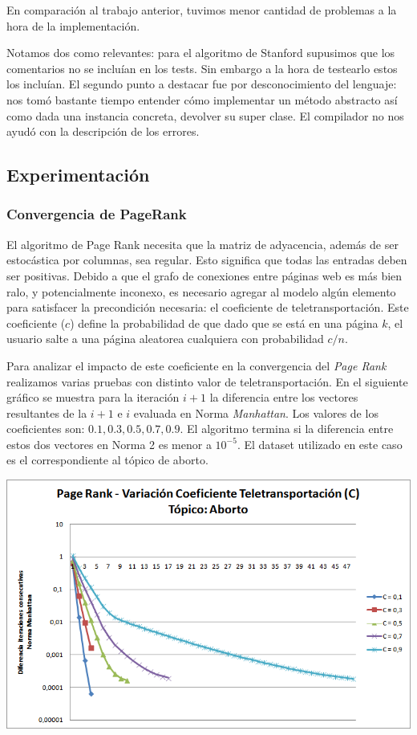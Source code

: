	En comparación al trabajo anterior, tuvimos menor cantidad de problemas a la hora de la implementación. 

	Notamos dos como relevantes: para el algoritmo de Stanford supusimos que los comentarios no se incluían en los tests. Sin embargo a la hora de testearlo estos los incluían. El segundo punto a destacar fue por desconocimiento del lenguaje: nos tomó bastante tiempo entender cómo implementar un método abstracto así como dada una instancia concreta, devolver su super clase. El compilador no nos ayudó con la descripción de los errores.

\subsection{Experimentación}
\subsubsection{Convergencia de PageRank}
	
	El algoritmo de Page Rank necesita que la matriz de adyacencia, además de ser estocástica por columnas, sea regular. Esto significa que todas las entradas deben ser positivas. Debido a que el grafo de conexiones entre páginas web es más bien ralo, y potencialmente inconexo, es necesario agregar al modelo algún elemento para satisfacer la precondición necesaria: el coeficiente de teletransportación. Este coeficiente ($c$) define la probabilidad de que dado que se está en una página $k$, el usuario salte a una página aleatorea cualquiera con probabilidad $c/n$.

	Para analizar el impacto de este coeficiente en la convergencia del \textit{Page Rank} realizamos varias pruebas con distinto valor de teletransportación. En el siguiente gráfico se muestra para la iteración $i+1$ la diferencia entre los vectores resultantes de la $i+1$ e $i$ evaluada en Norma \textit{Manhattan}. Los valores de los coeficientes son: $0.1, 0.3, 0.5, 0.7, 0.9$. El algoritmo termina si la diferencia entre estos dos vectores en Norma 2 es menor a $10^{-5}$. El dataset utilizado en este caso es el correspondiente al tópico de aborto.

	\par 
	\begin{center}
		\includegraphics[scale=0.6]{./img/page_rank_variacion_coef_teletransportacion.png}
	\end{center}
	\par 

